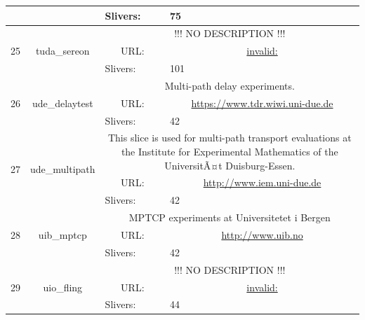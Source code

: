 \begin{small}
\begin{center}
\begin{longtable}{|c|c|c|c|}
  &  & \multicolumn{1}{|l|}{Slivers:} & \multicolumn{1}{|l|}{75} \\ \hline
 \multirow{3}{*}{25} & \multirow{3}{*}{\index{tuda\_sereon}\index{Slice!tuda\_sereon}tuda\_sereon} & \multicolumn{2}{|p{30em}|}{!!! NO DESCRIPTION !!!} \\* \cline{3-3}\cline{4-4}
  &  & \multicolumn{1}{|p{5em}|}{URL:} & \multicolumn{1}{|p{22.5em}|}{\url{invalid:}} \\* \cline{3-3}\cline{4-4}
  &  & \multicolumn{1}{|l|}{Slivers:} & \multicolumn{1}{|l|}{101} \\ \hline
 \multirow{3}{*}{26} & \multirow{3}{*}{\index{ude\_delaytest}\index{Slice!ude\_delaytest}ude\_delaytest} & \multicolumn{2}{|p{30em}|}{Multi-path delay experiments.} \\* \cline{3-3}\cline{4-4}
  &  & \multicolumn{1}{|p{5em}|}{URL:} & \multicolumn{1}{|p{22.5em}|}{\url{https://www.tdr.wiwi.uni-due.de}} \\* \cline{3-3}\cline{4-4}
  &  & \multicolumn{1}{|l|}{Slivers:} & \multicolumn{1}{|l|}{42} \\ \hline
 \multirow{3}{*}{27} & \multirow{3}{*}{\index{ude\_multipath}\index{Slice!ude\_multipath}ude\_multipath} & \multicolumn{2}{|p{30em}|}{This slice is used for multi-path transport evaluations at the Institute for Experimental Mathematics of the UniversitÃ¤t Duisburg-Essen.} \\* \cline{3-3}\cline{4-4}
  &  & \multicolumn{1}{|p{5em}|}{URL:} & \multicolumn{1}{|p{22.5em}|}{\url{http://www.iem.uni-due.de}} \\* \cline{3-3}\cline{4-4}
  &  & \multicolumn{1}{|l|}{Slivers:} & \multicolumn{1}{|l|}{42} \\ \hline
 \multirow{3}{*}{28} & \multirow{3}{*}{\index{uib\_mptcp}\index{Slice!uib\_mptcp}uib\_mptcp} & \multicolumn{2}{|p{30em}|}{MPTCP experiments at Universitetet i Bergen} \\* \cline{3-3}\cline{4-4}
  &  & \multicolumn{1}{|p{5em}|}{URL:} & \multicolumn{1}{|p{22.5em}|}{\url{http://www.uib.no}} \\* \cline{3-3}\cline{4-4}
  &  & \multicolumn{1}{|l|}{Slivers:} & \multicolumn{1}{|l|}{42} \\ \hline
 \multirow{3}{*}{29} & \multirow{3}{*}{\index{uio\_fling}\index{Slice!uio\_fling}uio\_fling} & \multicolumn{2}{|p{30em}|}{!!! NO DESCRIPTION !!!} \\* \cline{3-3}\cline{4-4}
  &  & \multicolumn{1}{|p{5em}|}{URL:} & \multicolumn{1}{|p{22.5em}|}{\url{invalid:}} \\* \cline{3-3}\cline{4-4}
  &  & \multicolumn{1}{|l|}{Slivers:} & \multicolumn{1}{|l|}{44} \\ \hline
\end{longtable}
\end{center}
\end{small}
